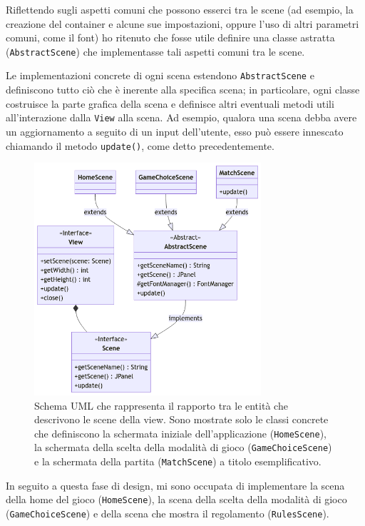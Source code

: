 \documentclass[a4paper,12pt]{report}
\begin{document}
Riflettendo sugli aspetti comuni che possono esserci tra le scene (ad esempio, la creazione del container e alcune sue impostazioni, oppure l'uso di altri parametri comuni, come il font) ho ritenuto che fosse utile definire una classe astratta (\texttt{AbstractScene}) che implementasse tali aspetti comuni tra le scene. 

Le implementazioni concrete di ogni scena estendono \texttt{AbstractScene} e definiscono tutto ciò che è inerente alla specifica scena; in particolare, ogni classe costruisce la parte grafica della scena e definisce altri eventuali metodi utili all'interazione dalla \texttt{View} alla scena. Ad esempio, qualora una scena debba avere un aggiornamento a seguito di un input dell'utente, esso può essere innescato chiamando il metodo \texttt{update()}, come detto precedentemente.

\begin{figure}[H]
\centering
\includegraphics[width=0.75\textwidth]{images/scenes.png}
\caption{Schema UML che rappresenta il rapporto tra le entità che descrivono le scene della view. Sono mostrate solo le classi concrete che definiscono la schermata iniziale dell'applicazione (\texttt{HomeScene}), la schermata della scelta della modalità di gioco (\texttt{GameChoiceScene}) e la schermata della partita (\texttt{MatchScene}) a titolo esemplificativo.}
\label{images:scenes}
\end{figure}

In seguito a questa fase di design, mi sono occupata di implementare la scena della home del gioco (\texttt{HomeScene}), la scena della scelta della modalità di gioco (\texttt{GameChoiceScene}) e della scena che mostra il regolamento (\texttt{RulesScene}).
\end{document}
